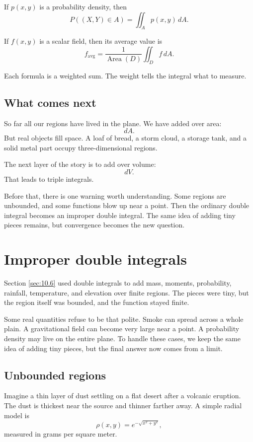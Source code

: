 If \(p(x,y)\) is a probability density, then
\[
\boxed{
    P((X,Y)\in A)=\iint_A p(x,y)\,dA.
}
\]

If \(f(x,y)\) is a scalar field, then its average value is
\[
\boxed{
    f_{\text{avg}}
    =
    \frac{1}{\operatorname{Area}(D)}
    \iint_D f\,dA.
}
\]

Each formula is a weighted sum.  The weight tells the integral what to measure.

\subsection{What comes next}

So far all our regions have lived in the plane.  We have added over area:
\[
    dA.
\]
But real objects fill space.  A loaf of bread, a storm cloud, a storage tank, and a solid
metal part occupy three-dimensional regions.

The next layer of the story is to add over volume:
\[
    dV.
\]
That leads to triple integrals.

Before that, there is one warning worth understanding.  Some regions are unbounded,
and some functions blow up near a point.  Then the ordinary double integral becomes an
improper double integral.  The same idea of adding tiny pieces remains, but convergence
becomes the new question.
\section{Improper double integrals}
\label{sec:10.7}

Section \ref{sec:10.6} used double integrals to add mass, moments, probability,
rainfall, temperature, and elevation over finite regions.  The pieces were tiny, but the
region itself was bounded, and the function stayed finite.

Some real quantities refuse to be that polite.  Smoke can spread across a whole plain.
A gravitational field can become very large near a point.  A probability density may
live on the entire plane.  To handle these cases, we keep the same idea of adding tiny
pieces, but the final answer now comes from a limit.

\subsection{Unbounded regions}

Imagine a thin layer of dust settling on a flat desert after a volcanic eruption.  The dust
is thickest near the source and thinner farther away.  A simple radial model is
\[
    \rho(x,y)=e^{-\sqrt{x^2+y^2}},
\]
measured in grams per square meter.

